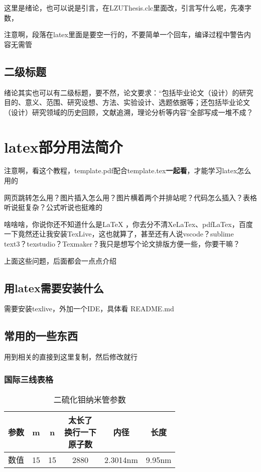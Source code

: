 \documentclass[AutoFakeBold]{LZUThesis}
\begin{document}
这里是绪论，也可以说是引言，在LZUThesis.clc里面改，引言写什么呢，先凑字数，

注意啊，段落在latex里面是要空一行的，不要简单一个回车，编译过程中警告内容无需管

\section{二级标题}

绪论其实也可以有二级标题，要不然，论文要求：“包括毕业论文（设计）的研究目的、意义、范围、研究设想、方法、实验设计、选题依据等；还包括毕业论文（设计）研究领域的历史回顾，文献追溯，理论分析等内容”全部写成一堆不成？



\chapter{latex部分用法简介}

注意啊，看这个教程，template.pdf配合template.tex\textbf{一起看}，才能学习latex怎么用的

网页跳转怎么用？图片插入怎么用？图片横着两个并排站呢？代码怎么插入？表格听说挺复杂？公式听说也挺难的

啥啥啥，你说你还不知道什么是LaTeX ，你去分不清XeLaTex、pdfLaTex，百度一下竟然还让我安装TexLive，这也就算了，甚至还有人说vscode？sublime text3？texstudio？Texmaker？我只是想写个论文排版方便一些，你要干嘛？

上面这些问题，后面都会一点点介绍

\section{用latex需要安装什么}

需要安装texlive，外加一个IDE，具体看 README.md


\section{常用的一些东西} %
\label{sec:常用的一些东西}

用到相关的直接到这里复制，然后修改就行

\subsection{国际三线表格} %
\label{sub:国际三线表格}

\begin{table}[H]
    \centering
    \caption{二硫化钼纳米管参数}
    \begin{tabular}{cccccc} %
    \toprule
    参数& m & n & \tabincell{c}{太长了\\换行一下\\原子数}  & 内径 & 长度\\
    \midrule
    数值 & 15 & 15  & 2880 & 2.3014nm & 9.95nm \\
    \bottomrule
    \end{tabular}
    \label{tbl_mos2_nanotube}
\end{table}
\end{document}
